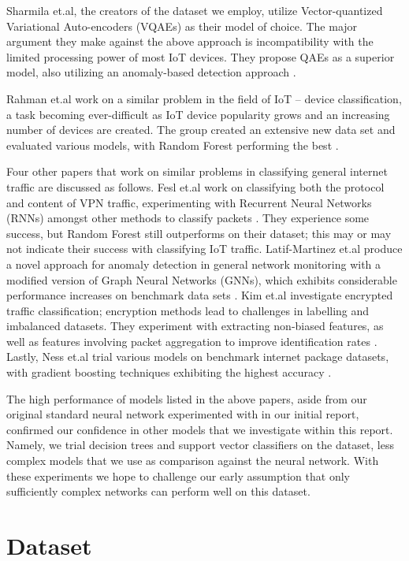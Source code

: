 \documentclass[11pt]{article}
\begin{document}
Sharmila et.al, the creators of the dataset we employ, utilize Vector-quantized Variational Auto-encoders (VQAEs) as their model of choice. The major argument they make against the above approach is incompatibility with the limited processing power of most IoT devices. They propose QAEs as a superior model, also utilizing an anomaly-based detection approach \citep{ref5}. 

Rahman et.al work on a similar problem in the field of IoT – device classification, a task becoming ever-difficult as IoT device popularity grows and an increasing number of devices are created. The group created an extensive new data set and evaluated various models, with Random Forest performing the best \citep{ref6}.

Four other papers that work on similar problems in classifying general internet traffic are discussed as follows. Fesl et.al work on classifying both the protocol and content of VPN traffic, experimenting with Recurrent Neural Networks (RNNs) amongst other methods to classify packets \citep{ref7}. They experience some success, but Random Forest still outperforms on their dataset; this may or may not indicate their success with classifying IoT traffic. Latif-Martinez et.al produce a novel approach for anomaly detection in general network monitoring with a modified version of Graph Neural Networks (GNNs), which exhibits considerable performance increases on benchmark data sets \citep{ref8}. Kim et.al investigate encrypted traffic classification; encryption methods lead to challenges in labelling and imbalanced datasets. They experiment with extracting non-biased features, as well as features involving packet aggregation to improve identification rates \citep{ref9}. Lastly, Ness et.al trial various models on benchmark internet package datasets, with gradient boosting techniques exhibiting the highest accuracy \citep{ref10}. 

The high performance of models listed in the above papers, aside from our original standard neural network experimented with in our initial report, confirmed our confidence in other models that we investigate within this report. Namely, we trial decision trees and support vector classifiers on the dataset, less complex models that we use as comparison against the neural network. With these experiments we hope to challenge our early assumption that only sufficiently complex networks can perform well on this dataset.

\section{Dataset}
\end{document}
